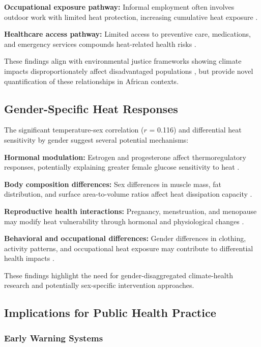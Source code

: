 \documentclass[11pt,a4paper]{article}
\begin{document}
\textbf{Occupational exposure pathway:} Informal employment often involves outdoor work with limited heat protection, increasing cumulative heat exposure \cite{xiang2014health}.

\textbf{Healthcare access pathway:} Limited access to preventive care, medications, and emergency services compounds heat-related health risks \cite{bell2018changes}.

These findings align with environmental justice frameworks showing climate impacts disproportionately affect disadvantaged populations \cite{bullard2008toxic, islam2017climate}, but provide novel quantification of these relationships in African contexts.

\subsection{Gender-Specific Heat Responses}

The significant temperature-sex correlation ($r$ = 0.116) and differential heat sensitivity by gender suggest several potential mechanisms:

\textbf{Hormonal modulation:} Estrogen and progesterone affect thermoregulatory responses, potentially explaining greater female glucose sensitivity to heat \cite{charkoudian2016sex, stachenfeld2000estrogen}.

\textbf{Body composition differences:} Sex differences in muscle mass, fat distribution, and surface area-to-volume ratios affect heat dissipation capacity \cite{havenith2016thermal, notley2019revisiting}.

\textbf{Reproductive health interactions:} Pregnancy, menstruation, and menopause may modify heat vulnerability through hormonal and physiological changes \cite{romeijn2011correlated, nakamura2011central}.

\textbf{Behavioral and occupational differences:} Gender differences in clothing, activity patterns, and occupational heat exposure may contribute to differential health impacts \cite{flouris2018workers}.

These findings highlight the need for gender-disaggregated climate-health research and potentially sex-specific intervention approaches.

\subsection{Implications for Public Health Practice}

\subsubsection{Early Warning Systems}
\end{document}
